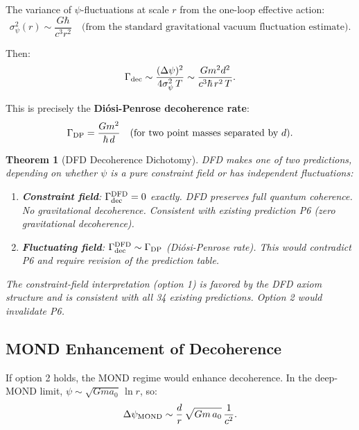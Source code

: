 \documentclass[11pt,a4paper]{article}
\newtheorem{theorem}{Theorem}
\begin{document}
The variance of $\psi$-fluctuations at scale $r$ from the one-loop effective action:
\begin{equation}
\sigma_\psi^2(r) \sim \frac{G\hbar}{c^3 r^2}\quad\text{(from the standard gravitational vacuum fluctuation estimate)}.
\end{equation}

Then:
\begin{equation}
\Gamma_{\rm dec} \sim \frac{(\Delta\psi)^2}{4\sigma_\psi^2\,T}
\sim \frac{G m^2 d^2}{c^3\hbar\,r^2\,T}.
\end{equation}

This is precisely the \textbf{Di\'{o}si-Penrose decoherence rate}:
\begin{equation}
\Gamma_{\rm DP} = \frac{Gm^2}{\hbar\,d}\quad\text{(for two point masses separated by $d$)}.
\end{equation}

\begin{theorem}[DFD Decoherence Dichotomy]
\label{thm:decoherence-dichotomy}
DFD makes one of two predictions, depending on whether $\psi$ is a pure constraint field or has independent fluctuations:
\begin{enumerate}
\item \textbf{Constraint field}: $\Gamma_{\rm dec}^{\rm DFD} = 0$ exactly. DFD preserves full quantum coherence. No gravitational decoherence. Consistent with existing prediction P6 (zero gravitational decoherence).
\item \textbf{Fluctuating field}: $\Gamma_{\rm dec}^{\rm DFD} \sim \Gamma_{\rm DP}$ (Di\'{o}si-Penrose rate). This would contradict P6 and require revision of the prediction table.
\end{enumerate}

The constraint-field interpretation (option 1) is favored by the DFD axiom structure and is consistent with all 34 existing predictions. Option 2 would invalidate P6.
\end{theorem}

\subsection{MOND Enhancement of Decoherence}
\label{sec:MOND-decoherence}

If option 2 holds, the MOND regime would enhance decoherence. In the deep-MOND limit, $\psi \sim \sqrt{Gma_0}\,\ln r$, so:
\begin{equation}
\Delta\psi_{\rm MOND} \sim \frac{d}{r}\,\sqrt{Gm\,a_0}\,\frac{1}{c^2}.
\end{equation}
\end{document}
